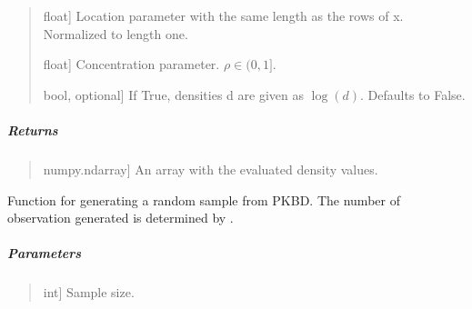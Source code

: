 \documentclass[letterpaper,10pt,english,openany,oneside]{sphinxmanual}
\begin{document}
{{{{\begin{fulllineitems}
\begin{quote}
\begin{description}
\sphinxlineitem{mu}{[}float{]}
\sphinxAtStartPar
Location parameter with the same length as the rows of x. Normalized to length one.

\sphinxlineitem{rho}{[}float{]}
\sphinxAtStartPar
Concentration parameter. \(\rho \in (0,1]\).

\sphinxlineitem{logdens}{[}bool, optional{]}
\sphinxAtStartPar
If True, densities d are given as \(\log(d)\). Defaults to False.

\end{description}
\end{quote}


\subparagraph{Returns}
\label{\detokenize{api_reference/generated/QuadratiK.spherical_clustering.PKBD:returns}}\begin{quote}
\begin{description}
\sphinxlineitem{density}{[}numpy.ndarray{]}
\sphinxAtStartPar
An array with the evaluated density values.

\end{description}
\end{quote}

\end{fulllineitems}


\begin{fulllineitems}
\label{\detokenize{api_reference/generated/QuadratiK.spherical_clustering.PKBD:QuadratiK.spherical_clustering.PKBD.rpkb}}
\pysigstartsignatures
{}
\pysigstopsignatures
\sphinxAtStartPar
Function for generating a random sample from PKBD.
The number of observation generated is determined by .


\subparagraph{Parameters}
\label{\detokenize{api_reference/generated/QuadratiK.spherical_clustering.PKBD:id1}}\begin{quote}
\begin{description}
\sphinxlineitem{n}{[}int{]}
\sphinxAtStartPar
Sample size.


\end{description}
\end{quote}
\end{fulllineitems}}}}}
\end{document}
